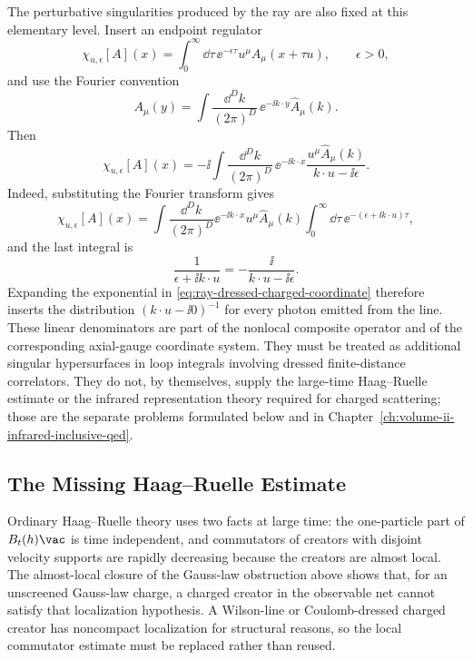 The perturbative singularities produced by the ray are also fixed at this
elementary level.  Insert an endpoint regulator
\[
  \chi_{u,\epsilon}[A](x)
  =
  \int_0^\infty\dd\tau\,\ee^{-\epsilon\tau}
  u^\mu A_\mu(x+\tau u),
  \qquad \epsilon>0,
\]
and use the Fourier convention
\[
  A_\mu(y)=\int\frac{\dd^D k}{(2\pi)^D}\,
  \ee^{-\ii k\cdot y}\widehat A_\mu(k).
\]
Then
\begin{equation}
  \chi_{u,\epsilon}[A](x)
  =
  -\ii
  \int\frac{\dd^D k}{(2\pi)^D}\,
  \ee^{-\ii k\cdot x}
  \frac{u^\mu\widehat A_\mu(k)}{k\cdot u-\ii\epsilon}.
  \label{eq:finite-ray-dressing-eikonal-denominator}
\end{equation}
Indeed, substituting the Fourier transform gives
\[
  \chi_{u,\epsilon}[A](x)
  =
  \int\frac{\dd^D k}{(2\pi)^D}
  \ee^{-\ii k\cdot x}u^\mu\widehat A_\mu(k)
  \int_0^\infty\dd\tau\,
  \ee^{-(\epsilon+\ii k\cdot u)\tau},
\]
and the last integral is
\[
  \frac{1}{\epsilon+\ii k\cdot u}
  =
  -\frac{\ii}{k\cdot u-\ii\epsilon}.
\]
Expanding the exponential in
\eqref{eq:ray-dressed-charged-coordinate} therefore inserts the distribution
\((k\cdot u-\ii0)^{-1}\) for every photon emitted from the line.  These
linear denominators are part of the nonlocal composite operator and of the
corresponding axial-gauge coordinate system.  They must be treated as
additional singular hypersurfaces in loop integrals involving dressed
finite-distance correlators.  They do not, by themselves, supply the
large-time Haag--Ruelle estimate or the infrared representation theory
required for charged scattering; those are the separate problems formulated
below and in Chapter~\ref{ch:volume-ii-infrared-inclusive-qed}.

\subsection{The Missing Haag--Ruelle Estimate}

Ordinary Haag--Ruelle theory uses two facts at large time: the one-particle
part of \(B_t(h)\vac\) is time independent, and commutators of creators with
disjoint velocity supports are rapidly decreasing because the creators are
almost local.  The almost-local closure of the Gauss-law obstruction above
shows that, for an unscreened Gauss-law charge, a charged creator in the
observable net cannot satisfy that localization hypothesis.  A Wilson-line or
Coulomb-dressed charged creator has noncompact localization for structural
reasons, so the local commutator estimate must be replaced rather than reused.

